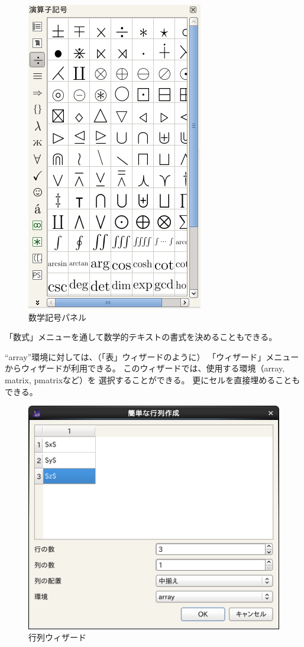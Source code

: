 \begin{figure}[H]
  \centering
  \includegraphics{doc12.png}
  \caption{数学記号パネル}
\end{figure}

「数式」メニューを通して数学的テキストの書式を決めることもできる。

``array''環境に対しては、（「表」ウィザードのように）
「ウィザード」メニューからウィザードが利用できる。
このウィザードでは、使用する環境（array, matrix, pmatrixなど）を
選択することができる。
更にセルを直接埋めることもできる。

\begin{figure}[H]
  \centering
  \includegraphics{doc13.png}
  \caption{行列ウィザード}
\end{figure}

